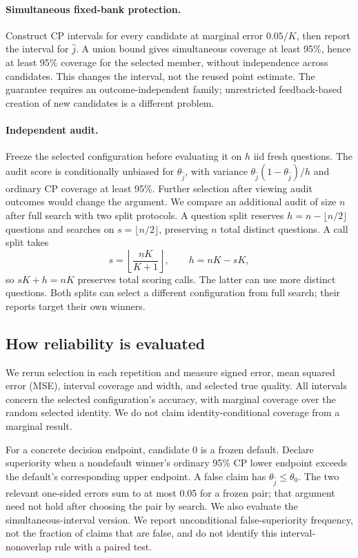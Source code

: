 \paragraph{Simultaneous fixed-bank protection.}
Construct CP intervals for every candidate at marginal error $0.05/K$, then report the interval for $\hat j$. A union bound gives simultaneous coverage at least 95\%, hence at least 95\% coverage for the selected member, without independence across candidates. This changes the interval, not the reused point estimate. The guarantee requires an outcome-independent family; unrestricted feedback-based creation of new candidates is a different problem.

\paragraph{Independent audit.}
Freeze the selected configuration before evaluating it on $h$ iid fresh questions. The audit score is conditionally unbiased for $\theta_{\hat j}$, with variance $\theta_{\hat j}(1-\theta_{\hat j})/h$ and ordinary CP coverage at least 95\%. Further selection after viewing audit outcomes would change the argument. We compare an additional audit of size $n$ after full search with two split protocols. A question split reserves $h=n-\lfloor n/2\rfloor$ questions and searches on $s=\lfloor n/2\rfloor$, preserving $n$ total distinct questions. A call split takes
\begin{equation}
 s=\left\lfloor\frac{nK}{K+1}\right\rfloor,\qquad h=nK-sK,
\end{equation}
so $sK+h=nK$ preserves total scoring calls. The latter can use more distinct questions. Both splits can select a different configuration from full search; their reports target their own winners.

\subsection{How reliability is evaluated}
We rerun selection in each repetition and measure signed error, mean squared error (MSE), interval coverage and width, and selected true quality. All intervals concern the selected configuration's accuracy, with marginal coverage over the random selected identity. We do not claim identity-conditional coverage from a marginal result.

For a concrete decision endpoint, candidate 0 is a frozen default. Declare superiority when a nondefault winner's ordinary 95\% CP lower endpoint exceeds the default's corresponding upper endpoint. A false claim has $\theta_{\hat j}\leq\theta_0$. The two relevant one-sided errors sum to at most 0.05 for a frozen pair; that argument need not hold after choosing the pair by search. We also evaluate the simultaneous-interval version. We report unconditional false-superiority frequency, not the fraction of claims that are false, and do not identify this interval-nonoverlap rule with a paired test.
